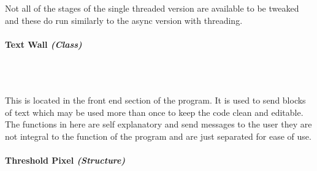 \begin{FlushLeft}
    Not all of the stages of the single threaded version are available to be tweaked and these do run similarly to the async version with threading. \\
    \bk


    \pagebreak
\paragraph{Text Wall \textit{(Class)}} \mbox{} \\

    \begin{figure}[H]
        \centering
    \end{figure}\\

    This is located in the front end section of the program. It is used to send blocks of text which may be used more than once to keep the code clean and editable. The functions in here are self explanatory and send messages to the user they are not integral to the function of the program and are just separated for ease of use. \\ 

    \bk

    \pagebreak
\paragraph{Threshold Pixel \textit{(Structure)}} \mbox{} \\

    \begin{figure}[H]
        \centering
    \end{figure}\\


\end{FlushLeft}
